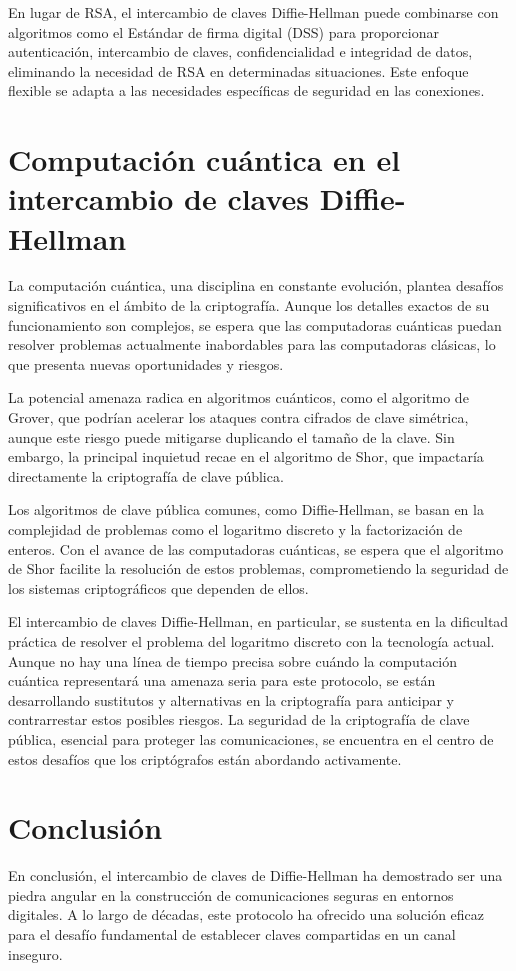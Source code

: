 \documentclass[11pt]{article}
\begin{document}
En lugar de RSA, el intercambio de claves Diffie-Hellman puede combinarse con algoritmos como el Estándar de firma digital (DSS) para proporcionar autenticación, intercambio de claves, confidencialidad e integridad de datos, eliminando la necesidad de RSA en determinadas situaciones. Este enfoque flexible se adapta a las necesidades específicas de seguridad en las conexiones.


\section{Computación cuántica en el intercambio de claves Diffie-Hellman}

La computación cuántica, una disciplina en constante evolución, plantea desafíos significativos en el ámbito de la criptografía. Aunque los detalles exactos de su funcionamiento son complejos, se espera que las computadoras cuánticas puedan resolver problemas actualmente inabordables para las computadoras clásicas, lo que presenta nuevas oportunidades y riesgos.

La potencial amenaza radica en algoritmos cuánticos, como el algoritmo de Grover, que podrían acelerar los ataques contra cifrados de clave simétrica, aunque este riesgo puede mitigarse duplicando el tamaño de la clave. Sin embargo, la principal inquietud recae en el algoritmo de Shor, que impactaría directamente la criptografía de clave pública.

Los algoritmos de clave pública comunes, como Diffie-Hellman, se basan en la complejidad de problemas como el logaritmo discreto y la factorización de enteros. Con el avance de las computadoras cuánticas, se espera que el algoritmo de Shor facilite la resolución de estos problemas, comprometiendo la seguridad de los sistemas criptográficos que dependen de ellos.

El intercambio de claves Diffie-Hellman, en particular, se sustenta en la dificultad práctica de resolver el problema del logaritmo discreto con la tecnología actual. Aunque no hay una línea de tiempo precisa sobre cuándo la computación cuántica representará una amenaza seria para este protocolo, se están desarrollando sustitutos y alternativas en la criptografía para anticipar y contrarrestar estos posibles riesgos. La seguridad de la criptografía de clave pública, esencial para proteger las comunicaciones, se encuentra en el centro de estos desafíos que los criptógrafos están abordando activamente.

\section{Conclusión}
En conclusión, el intercambio de claves de Diffie-Hellman ha demostrado ser una piedra angular en la construcción de comunicaciones seguras en entornos digitales. A lo largo de décadas, este protocolo ha ofrecido una solución eficaz para el desafío fundamental de establecer claves compartidas en un canal inseguro.
\end{document}
